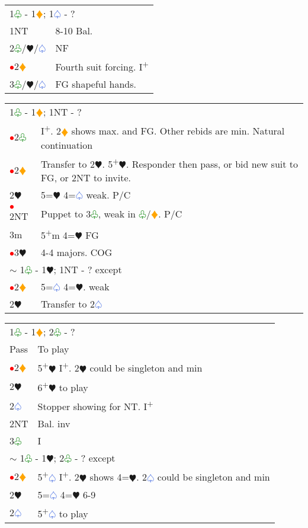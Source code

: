 \documentclass{article}
\renewcommand{\sp}{\textcolor{RoyalBlue}{$\varspade$}}
\newcommand{\he}{\textcolor{RubineRed}{$\varheart$}}
\newcommand{\di}{\textcolor{Orange}{$\vardiamond$}}
\newcommand{\cl}{\textcolor{Green}{$\varclub$}}
\newcommand{\nt}{\relsize{-1}NT\relsize{1}}
\newcommand{\up}{\textsuperscript{+}}
\newcommand{\al}{\textcolor{red}{$\bullet$}}
\begin{document}
\medskip

\begin{tabular}{|l|p{6.5cm}}
	\multicolumn{2}{l}{1\cl{} - 1\di{}; 1\sp{} - ?}\\
	1\nt & 8-10 Bal.\\
	2\cl{}/\he{}/\sp{} & NF \\
	\al{}2\di{} & Fourth suit forcing. I\up \\
    3\cl{}/\he{}/\sp{} & FG shapeful hands.
\end{tabular}

\medskip

\begin{tabular}{|l|p{6.5cm}}
	\multicolumn{2}{l}{1\cl{} - 1\di{}; 1\nt{} - ?}\\
	\al{}2\cl{} & I\up{}. 2\di{} shows max. and FG. Other rebids are min. Natural continuation\\
	\al{}2\di{} & Transfer to 2\he{}. 5\up\he{}. Responder then pass, or bid new suit to FG, or 2\nt{} to invite. \\
    2\he{}& 5=\he{} 4=\sp{} weak. P/C \\
    \al{}2\nt & Puppet to 3\cl{}, weak in \cl{}/\di{}. P/C \\
    3m & 5\up m 4=\he{} FG \\
    \al{}3\he{}& 4-4 majors. COG \\
		\multicolumn{2}{l}{$\sim$ 1\cl{} - 1\he{}; 1\nt{} - ? except}\\
		\al{}2\di{} & 5=\sp{} 4=\he{}. weak \\
		2\he{}& Transfer to 2\sp{} \\
\end{tabular}

\medskip

\begin{tabular}{|l|p{6.5cm}}
	\multicolumn{2}{l}{1\cl{} - 1\di{}; 2\cl{} - ?}\\
	Pass & To play \\
	\al{}2\di{} & 5\up{}\he{} I\up{}. 2\he{} could be singleton and min \\
	2\he{} & 6\up\he{} to play\\
	2\sp{} & Stopper showing for \nt{}. I\up{} \\
	2\nt{} & Bal. inv \\
	3\cl{} & I \\
	\multicolumn{2}{l}{$\sim$ 1\cl{} - 1\he{}; 2\cl{} - ? except} \\
	\al{}2\di{} & 5\up\sp{} I\up{}. 2\he{} shows 4=\he{}. 2\sp{} could be singleton and min \\
	2\he{} & 5=\sp{} 4=\he{} 6-9 \\
	2\sp{} & 5\up\sp{} to play
\end{tabular}
\end{document}
